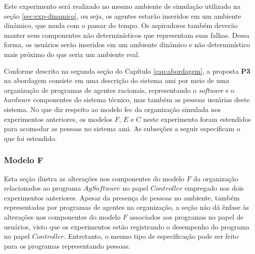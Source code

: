 \begin{figure}[h!]
    \centering
\end{figure}

Este experimento será realizado no mesmo ambiente de simulação utilizado na seção \ref{sec:exp-dinamico}, ou seja, os agentes estarão inseridos em um ambiente dinâmico, que muda com o passar do tempo. Os aspiradores também deverão manter seus componentes não determinísticos que representam suas falhas. Dessa forma, os usuários serão inseridos em um ambiente dinâmico e não determinístico mais próximo do que seria um ambiente real. 

Conforme descrito na segunda seção do Capítulo \ref{cap:abordagem}, a proposta \textbf{P3} na abordagem consiste em uma descrição do sistema \acrshort{ami} por meio de uma organização de programas de agentes racionais, representando o \textit{software} e o \textit{hardware} componentes do sistema técnico, mas também as pessoas usuárias deste sistema. No que diz respeito ao modelo \acrshort{fec} da organização simulada nos experimentos anteriores, os modelos $F$, $E$ e $C$ neste experimento foram estendidos para acomodar as pessoas no sistema \acrshort{ami}. As subseções a seguir especificam o que foi estendido. 

\subsubsection{Modelo F}

Esta seção ilustra as alterações nos componentes do modelo $F$ da organização relacionados ao programa $AgSoftware$ no papel $Controller$ empregado nos dois experimentos anteriores. Apesar da presença de pessoas no ambiente, também representadas por programas de agentes na organização, a seção não dá ênfase às alterações nos componentes do modelo $F$ associados aos programas no papel de usuários, visto que os experimentos estão registrando o desempenho do programa no papel $Controller$. Entretanto, o mesmo tipo de especificação pode ser feito para os programas representando pessoas.

